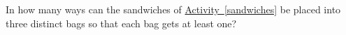 \documentclass{book}
\begin{document}
\setcounter{cpjt}{205}
\addtocounter{cpjt}{-1}
\begin{activity}\label{activity-198}
\hypertarget{p-1104}{}%
In how many ways can the sandwiches of \hyperref[sandwiches]{Activity~\ref{sandwiches}} be placed into three distinct bags so that each bag gets at least one?%
\par\smallskip%
\noindent\end{activity}

\clearpage
\end{document}
